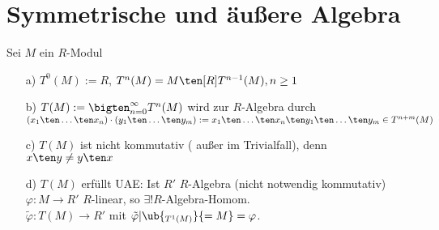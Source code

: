 \section{Symmetrische und äußere Algebra}

\begin{DefBem}
Sei $M$ ein $R$-Modul
\begin{enumerate}
\item[ a)] $T^0(M) := R$, $ T^n(M) = M \ten[R] T^{n-1}(M), n \geq 1$
\item[ b)] $T(M) := \bigten^{\infty}_{n = 0 } T^n(M)$ wird zur $R$-Algebra durch\\
$(x_1 \ten \dots \ten x_n) \cdot (y_1 \ten \dots \ten y_m) :=
x_1 \ten \dots \ten x_n \ten y_1 \ten \dots \ten y_m \in T^{n + m}(M)$
\item[ c)] $T(M)$ ist nicht kommutativ ( außer im Trivialfall), denn $ x \ten y \neq y \ten x$
\item[ d)] $T(M)$ erfüllt UAE: Ist $R'$ $R$-Algebra (nicht notwendig kommutativ) $\varphi: M \rightarrow R'$ $R$-linear, so $\exists ! R$-Algebra-Homom. \\
$\tilde{\varphi}:T(M) \rightarrow R'$ mit $\tilde{\varphi}|\ub{_{T^1(M)}}{=M}=\varphi$.
\end{enumerate}
\end{DefBem}

